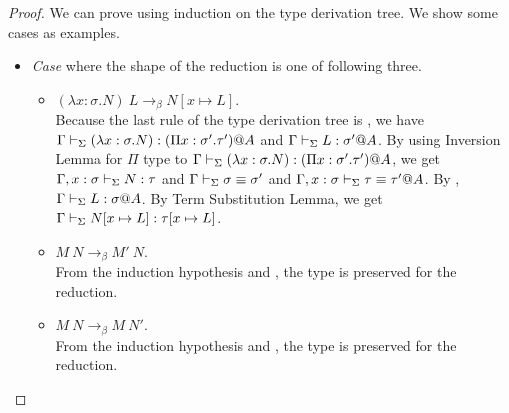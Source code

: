 \begin{proof}
	We can prove using induction on the type derivation tree.
	We show some cases as examples.
	\begin{itemize}
		\newcommand{\LB}{\longrightarrow_{\beta}}
																
		\item \textit{Case} \TApp{} where the shape of the reduction is one of following three.
		      \begin{itemize}
		      	\item $(\lambda x:\sigma.N)\ L \LB N[x\mapsto L]$.\\
		      	      Because the last rule of the type derivation tree is \TApp, 
		      	      we have $\Gamma \vdash_\Sigma (\lambda x:\sigma.N) : (\Pi x:\sigma'.\tau')@A$ and
		      	      $\Gamma \vdash_\Sigma L:\sigma' @A$.
		      	      By using Inversion Lemma for $\Pi$ type to $\Gamma \vdash_\Sigma (\lambda x:\sigma.N) : (\Pi x:\sigma'.\tau')@A$,
		      	      we get $\Gamma, x:\sigma \vdash_\Sigma N:\tau$ and $\Gamma \vdash_\Sigma \sigma \equiv \sigma'$ and $\Gamma ,x:\sigma \vdash_\Sigma \tau \equiv \tau'@A$.
		      	      By \TConv , $\Gamma \vdash_\Sigma L:\sigma @A$.
		      	      By Term Substitution Lemma, 
		      	      we get $\Gamma \vdash_\Sigma N[x\mapsto L]:\tau[x\mapsto L]$.
		      	      		      	      	      	      	      	      	      	      	      	      	      	      	      	      		      	      	      	      	      	      	      	      	      	      
		      	\item $M\ N \LB M'\ N$.\\
		      	      From the induction hypothesis and \TApp, the type is preserved for the reduction.
		      	\item $M\ N \LB M\ N'$.\\
		      	      From the induction hypothesis and \TApp, the type is preserved for the reduction.
		      \end{itemize}
		      		      	      	      	      	      	      	      		      	      	      	      	      
		      		      	      	      	      	      	      	      		      	      	      	      	      
		      		      	      	      	      	      	      	      		      	      	      	      	      
		      		      	      	      	      	      	      	      		      	      	      	      	      

\end{itemize}
\end{proof}
